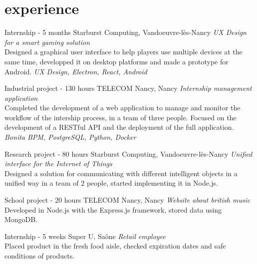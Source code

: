 \documentclass[]{lemaki-cv}
\begin{document}

		\section{experience}

		\begin{entrylist}


			{Internship {\normalfont{}- 5 months}}
			{Starburst Computing, Vandoeuvre-lès-Nancy}
			{\emph{UX Design for a smart gaming solution} \\
			Designed a graphical user interface to help players use multiple devices at the same time, developped it on desktop platforms and made a prototype for Android. \emph{UX Design, Electron, React, Android}}


			{Industrial project {\normalfont{}- 130 hours}}
			{TELECOM Nancy, Nancy}
			{\emph{Internship management application} \\
			Completed the development of a web application to manage and monitor
			the workflow of the intership process, in a team of three people.
			Focused on the development of a RESTful API and the deployment of
			the full application. \emph{Bonita BPM, PostgreSQL, Python, Docker}}


			{Research project {\normalfont{}- 80 hours}}
			{Starburst Computing, Vandoeuvre-lès-Nancy}
			{\emph{Unified interface for the Internet of Things} \\
			Designed a solution for communicating with different intelligent
			objects in a unified way in a team of 2 people, started implementing
			it in Node.js.}


			{School project {\normalfont{}- 20 hours}}
			{TELECOM Nancy, Nancy}
			{\emph{Website about british music} \\
			Developed in Node.js with the Express.js framework, stored data
			using MongoDB.}


			{Internship {\normalfont{}- 5 weeks}}
			{Super U, Saône}
			{\emph{Retail employee} \\
			Placed product in the fresh food aisle, checked expiration dates and
			safe conditions of products.}


\end{entrylist}
\end{document}

